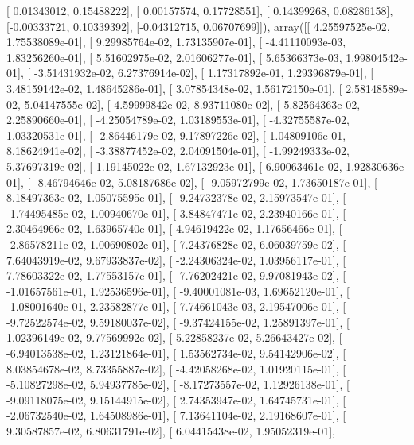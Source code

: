 \documentclass{article}
\begin{document}
       [ 0.01343012,  0.15488222],
       [ 0.00157574,  0.17728551],
       [ 0.14399268,  0.08286158],
       [-0.00333721,  0.10339392],
       [-0.04312715,  0.06707699]]), array([[  4.25597525e-02,   1.75538089e-01],
       [  9.29985764e-02,   1.73135907e-01],
       [ -4.41110093e-03,   1.83256260e-01],
       [  5.51602975e-02,   2.01606277e-01],
       [  5.65366373e-03,   1.99804542e-01],
       [ -3.51431932e-02,   6.27376914e-02],
       [  1.17317892e-01,   1.29396879e-01],
       [  3.48159142e-02,   1.48645286e-01],
       [  3.07854348e-02,   1.56172150e-01],
       [  2.58148589e-02,   5.04147555e-02],
       [  4.59999842e-02,   8.93711080e-02],
       [  5.82564363e-02,   2.25890660e-01],
       [ -4.25054789e-02,   1.03189553e-01],
       [ -4.32755587e-02,   1.03320531e-01],
       [ -2.86446179e-02,   9.17897226e-02],
       [  1.04809106e-01,   8.18624941e-02],
       [ -3.38877452e-02,   2.04091504e-01],
       [ -1.99249333e-02,   5.37697319e-02],
       [  1.19145022e-02,   1.67132923e-01],
       [  6.90063461e-02,   1.92830636e-01],
       [ -8.46794646e-02,   5.08187686e-02],
       [ -9.05972799e-02,   1.73650187e-01],
       [  8.18497363e-02,   1.05075595e-01],
       [ -9.24732378e-02,   2.15973547e-01],
       [ -1.74495485e-02,   1.00940670e-01],
       [  3.84847471e-02,   2.23940166e-01],
       [  2.30464966e-02,   1.63965740e-01],
       [  4.94619422e-02,   1.17656466e-01],
       [ -2.86578211e-02,   1.00690802e-01],
       [  7.24376828e-02,   6.06039759e-02],
       [  7.64043919e-02,   9.67933837e-02],
       [ -2.24306324e-02,   1.03956117e-01],
       [  7.78603322e-02,   1.77553157e-01],
       [ -7.76202421e-02,   9.97081943e-02],
       [ -1.01657561e-01,   1.92536596e-01],
       [ -9.40001081e-03,   1.69652120e-01],
       [ -1.08001640e-01,   2.23582877e-01],
       [  7.74661043e-03,   2.19547006e-01],
       [ -9.72522574e-02,   9.59180037e-02],
       [ -9.37424155e-02,   1.25891397e-01],
       [  1.02396149e-02,   9.77569992e-02],
       [  5.22858237e-02,   5.26643427e-02],
       [ -6.94013538e-02,   1.23121864e-01],
       [  1.53562734e-02,   9.54142906e-02],
       [  8.03854678e-02,   8.73355887e-02],
       [ -4.42058268e-02,   1.01920115e-01],
       [ -5.10827298e-02,   5.94937785e-02],
       [ -8.17273557e-02,   1.12926138e-01],
       [ -9.09118075e-02,   9.15144915e-02],
       [  2.74353947e-02,   1.64745731e-01],
       [ -2.06732540e-02,   1.64508986e-01],
       [  7.13641104e-02,   2.19168607e-01],
       [  9.30587857e-02,   6.80631791e-02],
       [  6.04415438e-02,   1.95052319e-01],
\end{document}
